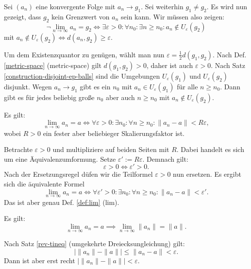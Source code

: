 \begin{Beweis}
Sei $(a_n)$ eine konvergente Folge mit $a_n\to g_1$. Sei weiterhin
$g_1\ne g_2$. Es wird nun gezeigt, dass $g_2$ kein Grenzwert von $a_n$
sein kann. Wir müssen also zeigen:
\[\neg\lim_{n\to\infty} a_n=g_2 \iff
\exists\varepsilon{>}0\colon\forall n_0\colon\exists n{\ge}n_0\colon
a_n\notin U_\varepsilon(g_2)\]
mit $a_n\notin U_\varepsilon(g_2)\iff d(a_n,g_2)\ge\varepsilon$.

Um dem Existenzquantor zu genügen, wählt man nun
$\varepsilon = \frac{1}{2}d(g_1,g_2)$.
Nach Def. \ref{metric-space} (metric-space) gilt 
$d(g_1,g_2)>0$, daher ist auch $\varepsilon>0$. Nach Satz
\ref{construction-disjoint-ep-balls} sind die Umgebungen
$U_\varepsilon(g_1)$ und $U_\varepsilon(g_2)$ disjunkt.
Wegen $a_n\to g_1$ gibt es ein $n_0$ mit $a_n\in U_\varepsilon(g_1)$ für alle
$n\ge n_0$. Dann gibt es für jedes beliebig große $n_0$ aber auch
$n\ge n_0$ mit $a_n\notin U_\varepsilon(g_2)$.\,\qedsymbol
\end{Beweis}

\begin{Satz}\label{lim-scaled-ep}
Es gilt:
\[\lim_{n\to\infty} a_n=a \iff
\forall\varepsilon{>}0\colon\exists n_0\colon\forall n{\ge}n_0\colon \|a_n-a\|<R\varepsilon,\]
wobei $R>0$ ein fester aber beliebieger Skalierungsfaktor ist.
\end{Satz}

\begin{Beweis}
Betrachte $\varepsilon>0$ und multipliziere auf beiden Seiten
mit $R$. Dabei handelt es sich um eine Äquivalenzumformung.
Setze $\varepsilon':=R\varepsilon$. Demnach gilt:
\[\varepsilon>0 \iff \varepsilon'>0.\]
Nach der Ersetzungsregel düfen wir die Teilformel $\varepsilon>0$
nun ersetzen. Es ergibt sich die äquivalente Formel
\[\lim_{n\to\infty} a_n=a \iff
\forall\varepsilon'{>}0\colon\exists n_0\colon\forall n{\ge}n_0\colon
\|a_n-a\|<\varepsilon'.\]
Das ist aber genau Def. \ref{def:lim} (lim).\,\qedsymbol
\end{Beweis}

\begin{Satz}
Es gilt:
\[\lim_{n\to\infty} a_n = a\implies \lim_{n\to\infty} \|a_n\| = \|a\|.\]
\end{Satz}

\begin{Beweis}
Nach Satz \ref{rev-tineq} (umgekehrte Dreiecksungleichung) gilt:
\[|\|a_n\|-\|a\|| \le \|a_n-a\| < \varepsilon.\]
Dann ist aber erst recht $|\|a_n\|-\|a\||<\varepsilon$.\,\qedsymbol
\end{Beweis}

